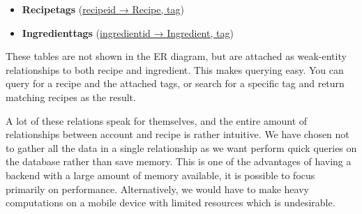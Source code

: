 \begin{itemize}
\item \textbf{Recipetags} (\underline{recipeid → Recipe, tag})

\item \textbf{Ingredienttags} (\underline{ingredientid → Ingredient, tag}) 
\end{itemize}

These tables are not shown in the ER diagram, but are attached as weak-entity relationships to both recipe and ingredient. This makes querying easy. You can query for a recipe and the attached tags, or search for a specific tag and return matching recipes as the result.

A lot of these relations speak for themselves, and the entire amount of relationships between account and recipe is rather intuitive. We have chosen not to gather all the data in a single relationship as we want perform quick queries on the database rather than save memory. This is one of the advantages of having a backend with a large amount of memory available, it is possible to focus primarily on performance. Alternatively, we would have to make heavy computations on a mobile device with limited resources which is undesirable.